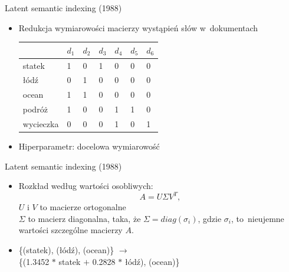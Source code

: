 \documentclass{beamer}
\begin{document}
	\begin{frame}{Latent semantic indexing (1988)}
		\begin{itemize}
			\item Redukcja wymiarowości macierzy wystąpień słów w~dokumentach
			\begin{center}
				\begin{tabular}{ | l | l | l | l | l | l | l |}
					\hline
					 & $d_1$ & $d_2$ & $d_3$ & $d_4$  & $d_5$  & $d_6$ \\ \hline
					statek & 1 & 0 & 1 & 0 & 0 & 0 \\ \hline
					łódź & 0 & 1 & 0 & 0 & 0 & 0 \\ \hline
					ocean & 1 & 1 & 0 & 0 & 0 & 0 \\ \hline
					podróż & 1 & 0 & 0 & 1 & 1 & 0 \\ \hline
					wycieczka & 0 & 0 & 0 & 1 & 0 & 1 \\
					\hline
				\end{tabular}
			\end{center}
			\item Hiperparametr: docelowa wymiarowość
		\end{itemize}
	\end{frame}
	\begin{frame}{Latent semantic indexing (1988)}
		\begin{itemize}
			\setlength\itemsep{3em}
			\item Rozkład według wartości osobliwych:
				\begin{equation}
				\label{eq:svd}
				A = U \Sigma V^T,\!
				\end{equation}
				$U$ i $V$ to macierze ortogonalne\\
				$\Sigma$ to macierz diagonalna, taka, że $\Sigma = diag(\sigma_i)$, gdzie $\sigma_{i}$, to~nieujemne wartości szczególne macierzy $A$.
			\item 
			\{(statek), (łódź), (ocean)\} $\to$ \\\{(1.3452 $*$ statek $+$ 0.2828 $*$ łódź), (ocean)\}
		\end{itemize}
	\end{frame}
\end{document}
